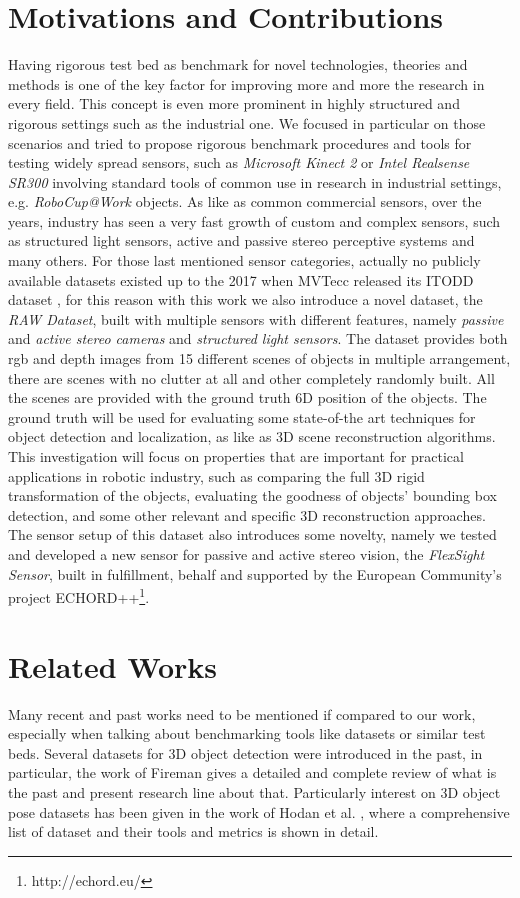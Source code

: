 \section{Motivations and Contributions}\label{sec:motivations}
Having rigorous test bed as benchmark for novel technologies, theories and methods is one of the key factor for improving more and more the research in every field. This concept is even more prominent in highly structured and rigorous settings such as the industrial one. We focused in particular on those scenarios and tried to propose rigorous benchmark procedures and tools for testing widely spread sensors, such as \emph{Microsoft Kinect 2} or \emph{Intel Realsense SR300} involving standard tools of common use in research in industrial settings, e.g. \emph{RoboCup@Work} objects. As like as common commercial sensors, over the years, industry has seen a very fast growth of custom and complex sensors, such as structured light sensors, active and passive stereo perceptive systems and many others. For those last mentioned sensor categories, actually no publicly available datasets existed up to the 2017 when MVTecc released its ITODD dataset \cite{mvtec2017itodd}, for this reason with this work we also introduce a novel dataset, the \emph{RAW Dataset}, built with multiple sensors with different features, namely \emph{passive} and \emph{active stereo cameras} and \emph{structured light sensors}. The dataset provides both rgb and depth images from 15 different scenes of objects in multiple arrangement, there are scenes with no clutter at all and other completely randomly built. All the scenes are provided with the ground truth 6D position of the objects. The ground truth will be used for evaluating some state-of-the art techniques for object detection and localization, as like as 3D scene reconstruction algorithms. This investigation will focus on properties that are important for practical applications in robotic industry, such as comparing the full 3D rigid transformation of the objects, evaluating the goodness of objects' bounding box detection, and some other relevant and specific 3D reconstruction approaches. The sensor setup of this dataset also introduces some novelty, namely we tested and developed a new sensor for passive and active stereo vision, the \emph{FlexSight Sensor}, built in fulfillment, behalf and supported by the European Community's project ECHORD++\footnote{http://echord.eu/}.

\section{Related Works}\label{sec:relatedwork}
Many recent and past works need to be mentioned if compared to our work, especially when talking about benchmarking tools like datasets or similar test beds. Several datasets for 3D object detection were introduced in the past, in particular, the work of Fireman \cite{Firman2016DatasetsReview} gives a detailed and complete review of what is the past and present research line about that. Particularly interest on 3D object pose datasets has been given in the work of Hodan et al. \cite{hodan20166DPoseEstimation}, where a comprehensive list of dataset and their tools and metrics is shown in detail.

